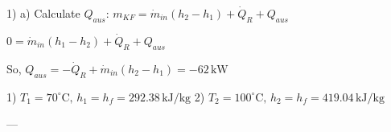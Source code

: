 1) a) Calculate \( Q_{aus} \):  
\( m_{KF} = \dot{m}_{in} (h_2 - h_1) + \dot{Q}_R + Q_{aus} \)  

\( 0 = \dot{m}_{in} (h_1 - h_2) + \dot{Q}_R + Q_{aus} \)  

So, \( Q_{aus} = -\dot{Q}_R + \dot{m}_{in} (h_2 - h_1) = -62 \, \text{kW} \)  

1) \( T_1 = 70^\circ \text{C}, \, h_1 = h_f = 292.38 \, \text{kJ/kg} \)  
2) \( T_2 = 100^\circ \text{C}, \, h_2 = h_f = 419.04 \, \text{kJ/kg} \)  

---